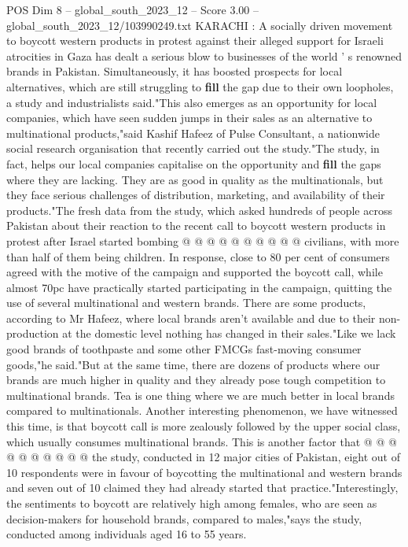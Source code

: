 \begin{textsample}{POS Dim 8 – global\_south\_2023\_12 – Score 3.00 – global\_south\_2023\_12/103990249.txt}  \label{ex:f8_pos_438}
KARACHI : A socially driven movement to boycott western products in protest against their alleged support for Israeli atrocities in Gaza has dealt a serious blow to businesses of the world ' s renowned brands in Pakistan.
Simultaneously, it has boosted prospects for local alternatives, which are still struggling to \textbf{fill} the gap due to their own loopholes, a study and industrialists said."This also emerges as an opportunity for local companies, which have seen sudden jumps in their sales as an alternative to multinational products,"said Kashif Hafeez of Pulse Consultant, a nationwide social research organisation that recently carried out the study."The study, in fact, helps our local companies capitalise on the opportunity and \textbf{fill} the gaps where they are lacking.
They are as good in quality as the multinationals, but they face serious challenges of distribution, marketing, and availability of their products."The fresh data from the study, which asked hundreds of people across Pakistan about their reaction to the recent call to boycott western products in protest after Israel started bombing @ @ @ @ @ @ @ @ @ @ civilians, with more than half of them being children.
In response, close to 80 per cent of consumers agreed with the motive of the campaign and supported the boycott call, while almost 70pc have practically started participating in the campaign, quitting the use of several multinational and western brands.
There are some products, according to Mr Hafeez, where local brands aren't available and due to their non-production at the domestic level nothing has changed in their sales."Like we lack good brands of toothpaste and some other FMCGs fast-moving consumer goods,"he said."But at the same time, there are dozens of products where our brands are much higher in quality and they already pose tough competition to multinational brands.
Tea is one thing where we are much better in local brands compared to multinationals.
Another interesting phenomenon, we have witnessed this time, is that boycott call is more zealously followed by the upper social class, which usually consumes multinational brands.
This is another factor that @ @ @ @ @ @ @ @ @ @ the study, conducted in 12 major cities of Pakistan, eight out of 10 respondents were in favour of boycotting the multinational and western brands and seven out of 10 claimed they had already started that practice."Interestingly, the sentiments to boycott are relatively high among females, who are seen as decision-makers for household brands, compared to males,"says the study, conducted among individuals aged 16 to 55 years.

\end{textsample}
